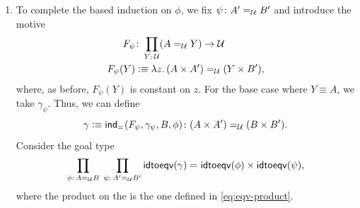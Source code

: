 \begin{solution}
\begin{enumerate}[a),font=\upshape]
\begin{enumerate}[-]
            \item To complete the based induction on $\phi$, we fix $\psi\colon A'\eq{\univ}B'$ and introduce the motive
            \begin{align*}
                F_\psi&\colon\prod_{Y\colon\univ}
                    (A\eq{\univ}Y)\to\univ\\
                F_\psi(Y)&\defeq\lambda z.\,
                    (A\times A')
                    \eq{\univ}(Y\times B'),
            \end{align*}
            where, as before, $F_\psi(Y)$ is constant on $z$. For the base case where $Y\equiv A$, we take $\gamma_\psi$. Thus, we can define
            \[
                \gamma\defeq\fun{ind}_{\eq{}}(F_\psi,\gamma_\psi,B,\phi)
                    \colon(A\times A')\eq{\univ}(B\times B').
            \]
            Consider the goal type
            \begin{align*}
                \prod_{\phi\colon A\eq\univ B}\;
                \prod_{\psi\colon A'\eq\univ B'}
                    \fun{idtoeqv}(\gamma)
                    \eq{}
                    \fun{idtoeqv}(\phi)\times\fun{idtoeqv}(\psi),
            \end{align*}
            where the product on the \rhs is the one defined in \eqref{eq:eqv-product}.
            

\end{enumerate}
\end{enumerate}
\end{solution}
